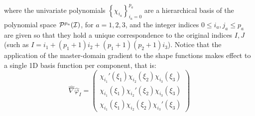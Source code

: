\noindent where the univariate polynomials $\left\{\chi_{i_a}\right\}_{i_a=0}^{p_a}$ are a hierarchical basis of the polynomial space $\mathcal{P}^{p_a}(\mathcal{I})$, for $a=1,2,3$, and the integer indices $0\leq i_a,j_a\leq p_a$ are given so that they hold a unique correspondence to the original indices $I,J$ (such as $I=i_1+(p_1+1)i_2+(p_1+1)(p_2+1)i_3$). Notice that the application of the master-domain gradient to the shape functions makes effect to a single 1D basis function per component, that is:
% 
\begin{equation}
    \hat{\nabla}\hat{\varphi}_I=\left(
    \begin{array}{c}
        \chi_{i_1}'(\xi_1)\chi_{i_2}(\xi_2)\chi_{i_3}(\xi_3) \\
        \chi_{i_1}(\xi_1)\chi_{i_2}'(\xi_2)\chi_{i_3}(\xi_3) \\
        \chi_{i_1}(\xi_1)\chi_{i_2}(\xi_2)\chi_{i_3}'(\xi_3)
    \end{array}\right)
    \label{gradtensor}
\end{equation}

